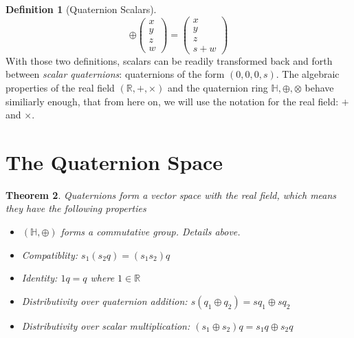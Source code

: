\documentclass{amsart}
\newtheorem{theorem}{Theorem}[section]
\theoremstyle{definition}
\newtheorem{definition}[theorem]{Definition}
\theoremstyle{remark}
\numberwithin{equation}{section}
\begin{document}
\begin{definition}[Quaternion Scalars]
\begin{equation}
    \oplus
    \begin{pmatrix}
      x \\
      y \\
      z \\
      w
    \end{pmatrix} = 
    \begin{pmatrix}
      x \\
      y \\
      z \\
      s + w
    \end{pmatrix}
  \end{equation}
  With those two definitions, scalars can be readily transformed back and forth between \emph{scalar quaternions}: quaternions of the form $(0, 0, 0, s)$. The algebraic properties of the real field $\left(\mathbb{R}, +, \times\right)$ and the quaternion ring $\mathbb{H}, \oplus, \otimes$ behave similiarly enough, that from here on, we will use the notation for the real field: $+$ and $\times$. 
\end{definition}

\section{The Quaternion Space}

\begin{theorem}
  Quaternions form a vector space with the real field, which means they have the following properties 
  \begin{itemize}
  \item $(\mathbb{H}, \oplus)$ forms a commutative group. Details above.
  \item Compatiblity: $s_1(s_2q) = (s_1s_2)q$
  \item Identity: $1q = q$ where $1\in\mathbb{R}$
  \item Distributivity over quaternion addition: $s(q_1\oplus q_2) = sq_1 \oplus sq_2$
  \item Distributivity over scalar multiplication: $(s_1\oplus s_2) q = s_1q \oplus s_2 q$
  \end{itemize}
\end{theorem}
\end{document}
